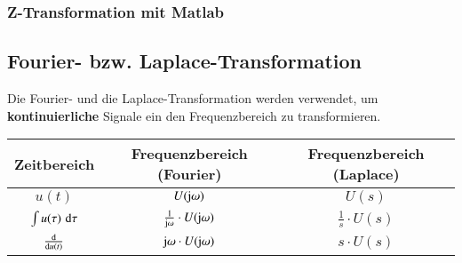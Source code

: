 \subsubsection{Z-Transformation mit Matlab}




\subsection{Fourier- bzw. Laplace-Transformation}

Die Fourier- und die Laplace-Transformation werden verwendet, um \textbf{kontinuierliche} Signale ein den Frequenzbereich zu transformieren.

\begin{center}
    \begin{tabular}{c |c | c}
        \textbf{Zeitbereich}            & \textbf{Frequenzbereich (Fourier)}                & \textbf{Frequenzbereich (Laplace)}    \\
        \midrule
        $u(t)$                          & $U(\mathrm{j} \omega)$                                 & $U(s)$                                \\
        $\int u(\tau) \, \mathop{} \! \mathrm{d} \tau$    & $\frac{1}{\mathrm{j} \omega} \cdot U(\mathrm{j} \omega)$    & $\frac{1}{s} \cdot U(s)$              \\
        $\frac{\mathop{} \! \mathrm{d}}{\mathop{} \! \mathrm{d} u(t)}$      & $\mathrm{j} \omega \cdot U(\mathrm{j} \omega)$              & $s \cdot U(s)$
    \end{tabular}
\end{center}
\renewcommand{\arraystretch}{1}
